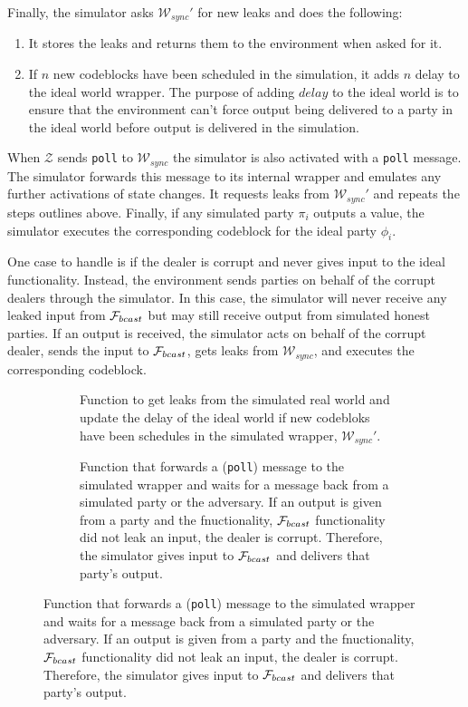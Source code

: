 Finally, the simulator asks $\mathcal{W}_{sync}'$ for new leaks and does the following:
\begin{enumerate}
	\item It stores the leaks and returns them to the environment when asked for it.
	\item If $n$ new codeblocks have been scheduled in the simulation, it adds $n$ delay to the ideal world wrapper. The purpose of adding $delay$ to the ideal world is to ensure that the environment can't force output being delivered to a party in the ideal world before output is delivered in the simulation.
\end{enumerate}

When $\mathcal{Z}$ sends \texttt{poll} to $\mathcal{W}_{sync}$ the simulator is also activated with a \texttt{poll} message.
The simulator forwards this message to its internal wrapper and emulates any further activations of state changes.
It requests leaks from $\mathcal{W}_{sync}'$ and repeats the steps outlines above.
Finally, if any simulated party $\pi_i$ outputs a value, the simulator executes the corresponding codeblock for the ideal party $\phi_i$.

One case to handle is if the dealer is corrupt and never gives input to the ideal functionality.
Instead, the environment sends parties on behalf of the corrupt dealers through the simulator.
In this case, the simulator will never receive any leaked input from $\mathcal{F}_{bcast}$ but may still receive output from simulated honest parties.
If an output is received, the simulator acts on behalf of the corrupt dealer, sends the input to $\mathcal{F}_{bcast}$, gets leaks from $\mathcal{W}_{sync}$, and executes the corresponding codeblock.

\begin{figure}
	
	\label{fig:sim:bracha_ours}
\end{figure}

\begin{figure}
	\begin{subfigure}{\textwidth}
	
	\label{fig:algo:simgetleaks}
	\caption{Function to get leaks from the simulated real world and update the delay of the ideal world if new codebloks have been schedules in the simulated wrapper, $\mathcal{W}_{sync}'$.}
	\end{subfigure}
	\newline
	\begin{subfigure}{\textwidth}
	
	\label{fig:algo:poll}
	\caption{Function that forwards a (\texttt{poll}) message to the simulated wrapper and waits for a message back from a simulated party or the adversary. If an output is given from a party and the fnuctionality, $\mathcal{F}_{bcast}$ functionality did not leak an input, the dealer is corrupt. Therefore, the simulator gives input to $\mathcal{F}_{bcast}$ and delivers that party's output.}
	\end{subfigure}
\end{figure}
